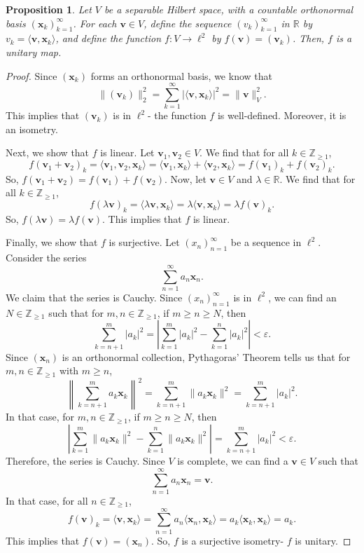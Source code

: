 \documentclass[a4paper, openany]{memoir}
\theoremstyle{definition}
\theoremstyle{plain}
\newtheorem{proposition}[definition]{Proposition}
\begin{document}
    \begin{proposition}
        Let $V$ be a separable Hilbert space, with a countable orthonormal basis $(\bm{x}_k)_{k=1}^\infty$. For each $\bm{v} \in V$, define the sequence $(v_k)_{k=1}^\infty$ in $\mathbb{R}$ by $v_k = \langle \bm{v}, \bm{x}_k \rangle$, and define the function $f: V \to \ell^2$ by $f(\bm{v}) = (\bm{v}_k)$. Then, $f$ is a unitary map.
    \end{proposition}
    \begin{proof}
        Since $(\bm{x}_k)$ forms an orthonormal basis, we know that
        \[\lVert (\bm{v}_k) \rVert_2^2 = \sum_{k=1}^\infty |\langle \bm{v}, \bm{x}_k \rangle|^2 = \lVert \bm{v} \rVert_V^2.\]
        This implies that $(\bm{v}_k)$ is in $\ell^2$- the function $f$ is well-defined. Moreover, it is an isometry.
        
        \noindent Next, we show that $f$ is linear. Let $\bm{v}_1, \bm{v}_2 \in V$. We find that for all $k \in \mathbb{Z}_{\geq 1}$,
        \[f(\bm{v}_1 + \bm{v}_2)_k = \langle \bm{v}_1, \bm{v}_2, \bm{x}_k \rangle = \langle \bm{v}_1, \bm{x}_k \rangle + \langle \bm{v}_2, \bm{x}_k \rangle = f(\bm{v}_1)_k + f(\bm{v}_2)_k.\]
        So, $f(\bm{v}_1 + \bm{v}_2) = f(\bm{v}_1) + f(\bm{v}_2)$. Now, let $\bm{v} \in V$ and $\lambda \in \mathbb{R}$. We find that for all $k \in \mathbb{Z}_{\geq 1}$,
        \[f(\lambda \bm{v})_k = \langle \lambda \bm{v}, \bm{x}_k \rangle = \lambda \langle \bm{v}, \bm{x}_k \rangle = \lambda f(\bm{v})_k.\]
        So, $f(\lambda \bm{v}) = \lambda f(\bm{v})$. This implies that $f$ is linear.

        \noindent Finally, we show that $f$ is surjective. Let $(x_n)_{n=1}^\infty$ be a sequence in $\ell^2$. Consider the series
        \[\sum_{n=1}^\infty a_n \bm{x}_n.\]
        We claim that the series is Cauchy. Since $(x_n)_{n=1}^\infty$ is in $\ell^2$, we can find an $N \in \mathbb{Z}_{\geq 1}$ such that for $m, n \in \mathbb{Z}_{\geq 1}$, if $m \geq n \geq N$, then
        \[\sum_{k=n+1}^m |a_k|^2 = \left| \sum_{k=1}^m |a_k|^2 - \sum_{k=1}^n |a_k|^2 \right| < \varepsilon.\]
        Since $(\bm{x}_n)$ is an orthonormal collection, Pythagoras' Theorem tells us that for $m, n \in \mathbb{Z}_{\geq 1}$ with $m \geq n$,
        \[\left\lVert \sum_{k=n+1}^m a_k \bm{x}_k \right\rVert^2 = \sum_{k=n+1}^m \lVert a_k \bm{x}_k \rVert^2 = \sum_{k=n+1}^m |a_k|^2.\]
        In that case, for $m, n \in \mathbb{Z}_{\geq 1}$, if $m \geq n \geq N$, then
        \[\left|\sum_{k=1}^m \lVert a_k \bm{x}_k \rVert^2 - \sum_{k=1}^n \lVert a_k \bm{x}_k \rVert^2 \right| = \sum_{k=n+1}^m |a_k|^2 < \varepsilon.\]
        Therefore, the series is Cauchy. Since $V$ is complete, we can find a $\bm{v} \in V$ such that 
        \[\sum_{n=1}^\infty a_n \bm{x}_n = \bm{v}.\]
        In that case, for all $n \in \mathbb{Z}_{\geq 1}$,
        \[f(\bm{v})_k = \langle \bm{v}, \bm{x}_k  \rangle = \sum_{n=1}^\infty a_n \langle \bm{x}_n, \bm{x}_k \rangle  = a_k \langle \bm{x}_k, \bm{x}_k \rangle = a_k.\]
        This implies that $f(\bm{v}) = (\bm{x}_n)$. So, $f$ is a surjective isometry- $f$ is unitary.
    \end{proof}
    
\end{document}
